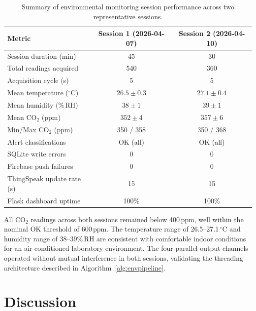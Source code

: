 \begin{table}[tbp]
  \centering
  \caption{Summary of environmental monitoring session performance across two representative sessions.}
  \label{tab:envsummary}
  \renewcommand{\arraystretch}{1.3}
  \begin{tabular}{lcc}
    \toprule
    Metric & Session 1 (2026-04-07) & Session 2 (2026-04-10) \\
    \midrule
    Session duration (min)         & 45           & 30           \\
    Total readings acquired        & 540          & 360          \\
    Acquisition cycle (s)          & 5            & 5            \\
    Mean temperature ($^\circ$C)   & $26.5\pm0.3$ & $27.1\pm0.4$ \\
    Mean humidity (\%\,RH)        & $38\pm1$     & $39\pm1$     \\
    Mean CO$_2$ (ppm)              & $352\pm4$    & $357\pm6$    \\
    Min/Max CO$_2$ (ppm)           & 350 / 358    & 350 / 368    \\
    Alert classifications          & OK (all)     & OK (all)     \\
    SQLite write errors            & 0            & 0            \\
    Firebase push failures         & 0            & 0            \\
    ThingSpeak update rate (s)     & 15           & 15           \\
    Flask dashboard uptime         & 100\%        & 100\%        \\
    \bottomrule
  \end{tabular}
\end{table}

All CO$_2$ readings across both sessions remained below 400\,ppm,
well within the nominal OK threshold of 600\,ppm. The temperature
range of 26.5--27.1\,$^\circ$C and humidity range of 38--39\%\,RH are
consistent with comfortable indoor conditions for an air-conditioned
laboratory environment. The four parallel output channels operated
without mutual interference in both sessions, validating the threading
architecture described in Algorithm~\ref{alg:envpipeline}.

\section{Discussion}
\label{sec:disc}

